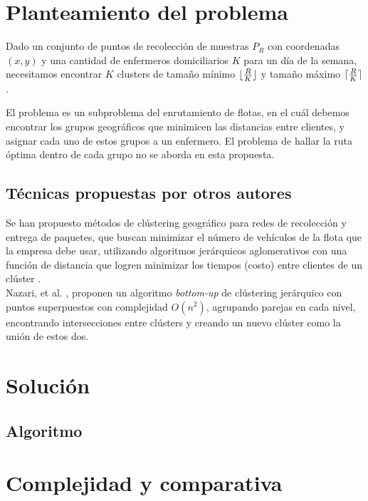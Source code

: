 \documentclass[runningheads]{llncs}
\DeclarePairedDelimiter{\ceil}{\lceil}{\rceil}
\DeclarePairedDelimiter{\floor}{\lfloor}{\rfloor}
\begin{document}
\section{Planteamiento del problema}
Dado un conjunto de puntos de recolección de muestras $P_{R}$ con coordenadas
$(x, y)$ y una cantidad de enfermeros domiciliarios $K$ para un día de la semana,
necesitamos encontrar $K$ clusters de tamaño mínimo $\floor{\frac{R}{K}}$ y tamaño
máximo $\ceil{\frac{R}{K}}$.

El problema es un subproblema del enrutamiento de flotas, en el cuál debemos encontrar
los grupos geográficos que minimicen las distancias entre clientes, y asignar cada uno
de estos grupos a un enfermero. El problema de hallar la ruta óptima dentro de cada
grupo no se aborda en esta propuesta.
\subsection{Técnicas propuestas por otros autores}
Se han propuesto métodos de clústering geográfico para redes de recolección y entrega
de paquetes, que buscan minimizar el número de vehículos de la flota que
la empresa debe usar, utilizando algoritmos jerárquicos aglomerativos con una función
de distancia que logren minimizar los tiempos (costo) entre clientes de un clúster
\cite{bard11}.
\\
Nazari, et al. \cite{nazari19}, proponen un algoritmo \textit{bottom-up} de clústering
jerárquico con puntos superpuestos con complejidad $O(n^{2})$, agrupando parejas en cada nivel,
encontrando intersecciones entre clústers y creando un nuevo clúster como la unión de estos dos.
\section{Solución}
\subsection{Algoritmo}
\section{Complejidad y comparativa}
%
%
%
\renewcommand{\refname}{Referencias}


\end{document}
